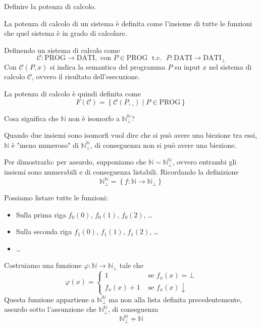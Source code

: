 \documentclass[12pt, answers]{exam}
\theoremstyle{plain}
\newcommand{\tc}{\; \text{ t.c. } \;}
\newcommand{\dati}{\text{DATI}}
\newcommand{\prog}{\text{PROG}}
\newcommand{\C}{\mathcal{C}}
\newcommand{\N}{\mathbb{N}}
\begin{document}
\begin{questions}
        \question Definire la potenza di calcolo.
        
        \begin{solution}
            La potenza di calcolo di un sistema è definita come l'insieme di tutte le funzioni che quel sistema è in grado di calcolare.
            
            Definendo un sistema di calcolo come 
            $$ \C: \prog \rightarrow \dati, \text{ con } P \in \prog \tc P: \dati \rightarrow \dati_\bot $$
            Con $\C(P,x)$ si indica la semantica del programma $P$ su input $x$ nel sistema di calcolo $\C$, ovvero il risultato dell'esecuzione.
            
            La potenza di calcolo è quindi definita come
            $$ F(\C) = \left\{\C(P, \_) \mid P \in \prog \right\} $$
        \end{solution}
        
        \question Cosa significa che $\N$ non è isomorfo a $\N_\bot^\N$?
        
        \begin{solution}
            Quando due insiemi sono isomorfi vuol dire che si può avere una biezione tra essi, $\N$ è "meno numeroso" di $\N_\bot^\N$, di conseguenza non si può avere una biezione.
            
            Per dimostrarlo: per assurdo, supponiamo che $\N \sim \N_\bot^\N$, ovvero entrambi gli insiemi sono numerabili e di conseguenza listabili. Ricordando la definizione
            $$ \N_\bot^\N = \left\{f: \N \rightarrow \N_\bot \right\} $$
            
            Possiamo listare tutte le funzioni: 
            \begin{itemize}
                \item Sulla prima riga $f_0(0)$, $f_0(1)$, $f_0(2)$, \dots
                
                \item Sulla seconda riga $f_1(0)$, $f_1(1)$, $f_1(2)$, \dots
                
                \item \dots
            \end{itemize}
            
            Costruiamo una funzione $\varphi: \N \rightarrow \N_\bot$ tale che
            $$ \varphi (x) = \begin{cases}
                1 & \text{ se } f_x(x) = \bot \\
                f_x(x) + 1 & \text{ se } f_x(x) \downarrow
            \end{cases}$$
            Questa funzione appartiene a $\N_\bot^\N$ ma non alla lista definita precedentemente, assurdo sotto l'assunzione che $\N_\bot^\N$, di conseguenza
            $$ \N_\bot^\N \nsim \N $$
        \end{solution}
        

\end{questions}
\end{document}
